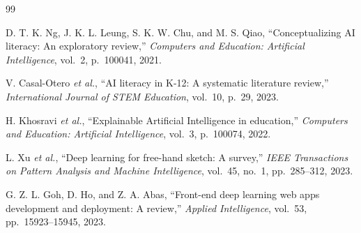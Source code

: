 \documentclass[12pt,a4paper,oneside,openany]{report}
\begin{document}
\begin{thebibliography}{99}

D. T. K. Ng, J. K. L. Leung, S. K. W. Chu, and M. S. Qiao, ``Conceptualizing AI literacy: An exploratory review,'' \textit{Computers and Education: Artificial Intelligence}, vol.~2, p.~100041, 2021.

V. Casal-Otero \textit{et al.}, ``AI literacy in K-12: A systematic literature review,'' \textit{International Journal of STEM Education}, vol.~10, p.~29, 2023.

H. Khosravi \textit{et al.}, ``Explainable Artificial Intelligence in education,'' \textit{Computers and Education: Artificial Intelligence}, vol.~3, p.~100074, 2022.

L. Xu \textit{et al.}, ``Deep learning for free-hand sketch: A survey,'' \textit{IEEE Transactions on Pattern Analysis and Machine Intelligence}, vol.~45, no.~1, pp.~285--312, 2023.

G. Z. L. Goh, D. Ho, and Z. A. Abas, ``Front-end deep learning web apps development and deployment: A review,'' \textit{Applied Intelligence}, vol.~53, pp.~15923--15945, 2023.

\end{thebibliography}
\end{document}

